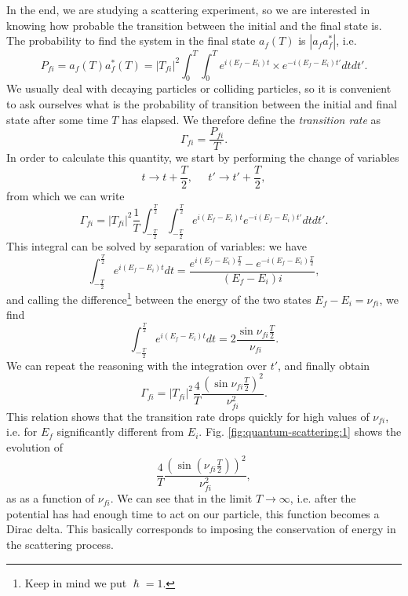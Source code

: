 In the end, we are studying a scattering experiment, so we are interested in knowing how probable the transition between the initial and the final state is. The probability to find the system in the final state $a_{f}(T)$ is $|a_{f}a^*_{f}|$, i.e.
\begin{equation*}
    P_{fi} = a_{f}(T)a_{f}^*(T) = |T_{fi}|^2\int_{0}^{T}\int_{0}^{T}e^{i(E_f-E_i)t}\times e^{-i(E_{f}-E_i)t'}dtdt'.
\end{equation*}
We usually deal with decaying particles or colliding particles, so it is convenient to ask ourselves what is the probability of transition between the initial and final state after some time $T$ has elapsed. We therefore define the \emph{transition rate} as
\begin{equation}
    \Gamma_{fi} = \frac{P_{fi}}{T}.
\end{equation}
In order to calculate this quantity, we start by performing the change of variables
\begin{equation}
    t\rightarrow t+\frac{T}{2},\;\;\;\;\; t' \rightarrow t' + \frac{T}{2},
\end{equation}
from which we can write
\begin{equation*}
    \Gamma_{fi} = |T_{fi}|^2\frac{1}{T}\int_{-\frac{T}{2}}^{\frac{T}{2}}\int_{-\frac{T}{2}}^{\frac{T}{2}} e^{i(E_{f}-E_{i})t}e^{-i(E_{f}-E_{i})t'}dtdt'.
\end{equation*}
This integral can be solved by separation of variables: we have
\begin{equation*}
    \int_{-\frac{T}{2}}^{\frac{T}{2}}e^{i(E_{f}-E_{i})t}dt = \frac{e^{i(E_{f}-E_{i})\frac{T}{2}}-e^{-i(E_{f}-E_{i})\frac{T}{2}}}{(E_{f}-E_{i})i},
\end{equation*}
and calling the difference\footnote{Keep in mind we put $\hslash=1$.} between the energy of the two states $E_{f} - E_{i} = \nu_{fi}$, we find
\begin{equation*}
     \int_{-\frac{T}{2}}^{\frac{T}{2}}e^{i(E_{f}-E_{i})t}dt = 2\frac{\sin{\nu_{fi}\frac{T}{2}}}{\nu_{fi}}.
\end{equation*}
We can repeat the reasoning with the integration over $t'$, and finally obtain 
\begin{equation*}
    \Gamma_{fi} = |T_{fi}|^2 \frac{4}{T}\frac{(\sin{\nu_{fi}\frac{T}{2}})^2}{\nu_{fi}^2}.
\end{equation*}
This relation shows that the transition rate drops quickly for high values of $\nu_{fi}$, i.e. for $E_f$ significantly different from $E_i$. Fig. \ref{fig:quantum-scattering:1} shows the evolution of
\begin{equation}\label{eq:sinusoidalenufi}
    \frac{4}{T}\frac{(\sin{(\nu_{fi}\frac{T}{2})})^2}{\nu_{fi}^2},
\end{equation}
as as a function of $\nu_{fi}$. We can see that in the limit $T\rightarrow\infty$, i.e. after the potential has had enough time to act on our particle, this function becomes a Dirac delta. This basically corresponds to imposing the conservation of energy in the scattering process.

